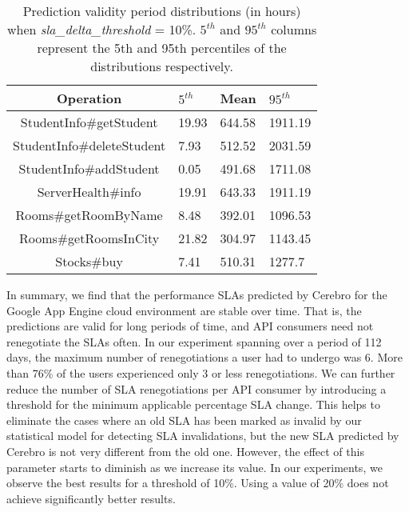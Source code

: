 \begin{table}
\begin{center}
\begin{tabular}{|c|p{1cm}|p{1cm}|p{1cm}|}
\hline
Operation & $5^{th}$ & Mean & $95^{th}$ \\ \hline
StudentInfo\#getStudent & 19.93 & 644.58 & 1911.19 \\ \hline
StudentInfo\#deleteStudent & 7.93 & 512.52 & 2031.59 \\ \hline
StudentInfo\#addStudent & 0.05 & 491.68 & 1711.08 \\ \hline
ServerHealth\#info & 19.91 & 643.33 & 1911.19 \\ \hline
Rooms\#getRoomByName & 8.48 & 392.01 & 1096.53 \\ \hline
Rooms\#getRoomsInCity & 21.82 & 304.97 & 1143.45 \\ \hline
Stocks\#buy & 7.41 & 510.31 & 1277.7 \\ \hline
\end{tabular}
\end{center}
\caption{Prediction validity period distributions (in hours)
when \textit{sla\_delta\_threshold} = 10\%. $5^{th}$ and $95^{th}$ 
columns represent the 5th and 95th percentiles of the
distributions respectively. 
\label{tab:validity_periods_sd10}
}
\vspace{-0.3in}
\end{table}


In summary, we find that the performance SLAs predicted by Cerebro 
for the Google App Engine cloud environment are stable over time. That is, the predictions are 
valid for long periods of time, and API consumers need not renegotiate the SLAs 
often. In our experiment spanning over a period of 112
days, the maximum number of renegotiations a user had to undergo was 6. More than 76\% of
the users experienced only 3 or less renegotiations. We can further reduce the number of 
SLA renegotiations per API consumer by introducing a threshold for the minimum applicable
percentage SLA change. This helps to eliminate the cases where an old SLA has been marked as invalid
by our statistical model for detecting SLA invalidations, but the new SLA predicted by Cerebro is not
very different from the old one. However, the effect of this parameter starts to diminish as we
increase its value. In our experiments, we observe the best results for a threshold of
10\%. Using a value of 20\% does not achieve significantly better results.
